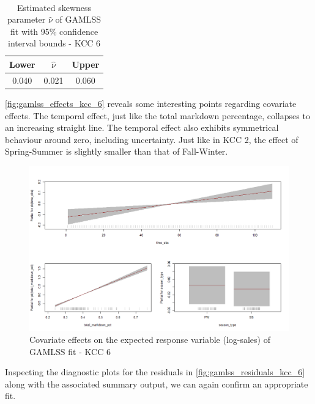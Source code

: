 \begin{table}[H]
\setlength\arrayrulewidth{1pt}  
\centering
\begin{adjustbox}{max width=\textwidth}\
\begin{tabular}{|c|c|c|}
\hline
\rowcolor{lightgray} 
Lower & $\hat{\nu}$ & Upper \\ \hline
0.040        & 0.021           & 0.060        \\ \hline
\end{tabular}
\end{adjustbox}
\caption{Estimated skewness parameter $\hat{\nu}$ of GAMLSS fit with 95\% confidence interval bounds - KCC 6}
\label{tab:nu_ci_kcc_6}
\end{table}



\autoref{fig:gamlss_effects_kcc_6} reveals some interesting points regarding covariate effects. The temporal effect, just like the total markdown percentage, collapses to an increasing straight line. The temporal effect also exhibits symmetrical behaviour around zero, including uncertainty. Just like in \ac{KCC} 2, the effect of Spring-Summer is slightly smaller than that of Fall-Winter.
\\






\begin{figure}[H]
\centering
  \includegraphics[width=0.95\linewidth]{figures/gamlss_effects_kcc_6.png}
  \caption{Covariate effects on the expected response variable (log-sales) of GAMLSS fit - KCC 6}
  \label{fig:gamlss_effects_kcc_6}
\end{figure}




Inspecting the diagnostic plots for the residuals in \autoref{fig:gamlss_residuals_kcc_6} along with the associated summary output, we can again confirm an appropriate fit.
\\



